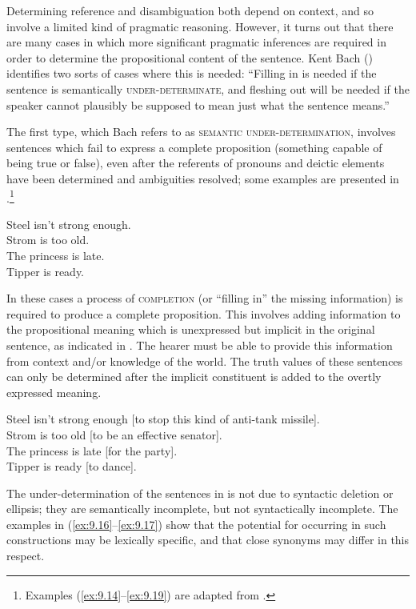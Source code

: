 Determining reference and disambiguation both depend on context, and so involve a limited kind of pragmatic reasoning. However, it turns out that there are many cases in which more significant pragmatic inferences are required in order to determine the propositional content of the sentence. Kent Bach (\citeyear{Bach1994}) identifies two sorts of cases where this is needed: “Filling in is needed if the sentence is semantically \textsc{under-determinate}, and fleshing out will be needed if the speaker cannot plausibly be supposed to mean just what the sentence means.”



The first type, which Bach refers to as \textsc{semantic under-determination}, involves sentences which fail to express a complete proposition (something capable of being true or false), even after the referents of pronouns and deictic elements have been determined and ambiguities resolved; some examples are presented in .\footnote{Examples (\ref{ex:9.14}–\ref{ex:9.19}) are adapted from \citet{Bach1994}.}


\ea \label{ex:9.14}
\ea Steel isn’t strong enough.\\
\ex Strom is too old.\\
\ex The princess is late.\\
\ex Tipper is ready.
                       \z
\z


In these cases a process of \textsc{completion} (or “filling in” the missing information) is required to produce a complete proposition. This involves adding information to the propositional meaning which is unexpressed but implicit in the original sentence, as indicated in . The hearer must be able to provide this information from context and/or knowledge of the world. The truth values of these sentences can only be determined after the implicit constituent is added to the overtly expressed meaning.


\ea \label{ex:9.15}
\ea Steel isn’t strong enough [to stop this kind of anti-tank missile].\\
\ex Strom is too old [to be an effective senator].\\
\ex The princess is late [for the party].\\
\ex Tipper is ready [to dance].
                       \z
\z


The under-determination of the sentences in  is not due to syntactic deletion or ellipsis; they are semantically incomplete, but not syntactically incomplete. The examples in (\ref{ex:9.16}--\ref{ex:9.17}) show that the potential for occurring in such constructions may be lexically specific, and that close synonyms may differ in this respect.


